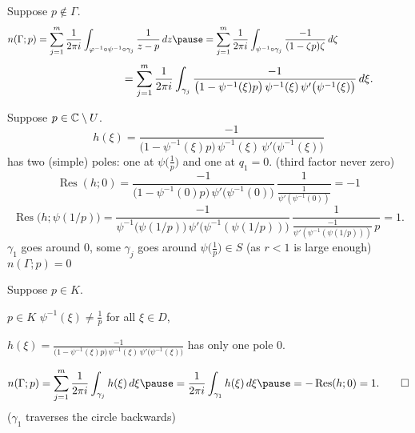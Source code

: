 \documentclass[10pt,aspectratio=169]{beamer}
\begin{document}
\begin{frame}
Suppose $p \not\in \Gamma$.
\[
n(\Gamma;p) = 
\sum_{j=1}^m
\frac{1}{2\pi i}
\int_{\varphi^{-1} \circ \psi^{-1} \circ \gamma_j}
\frac{1}{z-p} \, dz
\pause
=
\sum_{j=1}^m
\frac{1}{2\pi i}
\int_{\psi^{-1} \circ \gamma_j}
\frac{-1}{(1-\zeta p) \zeta} \, d\zeta
\hspace*{1in}
\]
\pause
\[
\hspace*{1in}
=
\sum_{j=1}^m
\frac{1}{2\pi i}
\int_{\gamma_j}
\frac{-1}{ \bigl( 1-\psi^{-1}(\xi)p \bigr)
\,
\psi^{-1}(\xi)
\,
\psi' \bigl(\psi^{-1}(\xi)\bigr)} \, d \xi .
\]

\pause
Suppose $p \in {\mathbb{C}} \setminus U$.
\pause
\[
h(\xi) =
\frac{-1}{ \bigl( 1-\psi^{-1}(\xi)p \bigr)
\,
\psi^{-1}(\xi)
\,
\psi' \bigl(\psi^{-1}(\xi)\bigr)}
\]
has two (simple) poles: one at $\psi\bigl(\frac{1}{p}\bigr)$ and one
at $q_1=0$.  \quad (third factor never zero)
\pause
\begin{equation*}
\operatorname{Res}(h;0) = 
\frac{-1}{ \bigl( 1-\psi^{-1}(0)p \bigr)
\,
\psi' \bigl(\psi^{-1}(0)\bigr)}
\,
\frac{1}{\frac{1}{\psi'(\psi^{-1}(0))}}
=
-1
\end{equation*}
\pause
\begin{equation*}
\operatorname{Res}\bigl(h;\psi(1/p)\bigr)
=
\frac{-1}{
\psi^{-1}\bigl(\psi(1/p)\bigr)
\,
\psi' \bigl(\psi^{-1}(\psi(1/p))\bigr)
}
\,
\frac{1}{
\frac{-1}{\psi'(\psi^{-1}(\psi(1/p)))}
\, p
}
=
1 .
\end{equation*}
\pause
$\gamma_1$ goes around $0$, \pause
some $\gamma_j$ goes around 
$\psi\bigl(\frac{1}{p}\bigr) \in S$ (as $r < 1$ is large enough)
\pause
\wthus
$n(\Gamma;p) = 0$
\end{frame}

\begin{frame}
Suppose $p \in K$.
\pause
\medskip

$p \in K$ \wthus $\psi^{-1}(\xi) \not= \frac{1}{p}$ for all $\xi \in D$,

\quad
\pause

\thus
\quad
$\displaystyle
h(\xi) =
\frac{-1}{ \bigl( 1-\psi^{-1}(\xi)p \bigr)
\,
\psi^{-1}(\xi)
\,
\psi' \bigl(\psi^{-1}(\xi)\bigr)}
$
\quad
has only one pole $0$.

\medskip

\pause
\begin{equation*}
n(\Gamma;p) = 
\sum_{j=1}^m
\frac{1}{2\pi i}
\int_{\gamma_j} h(\xi) \, d\xi 
\pause
=
\frac{1}{2\pi i}
\int_{\gamma_1} h(\xi) \, d\xi 
\pause
= - \operatorname{Res}(h;0) = 1 .  \qed
\end{equation*}
($\gamma_1$ traverses the circle backwards)
\end{frame}
\end{document}
